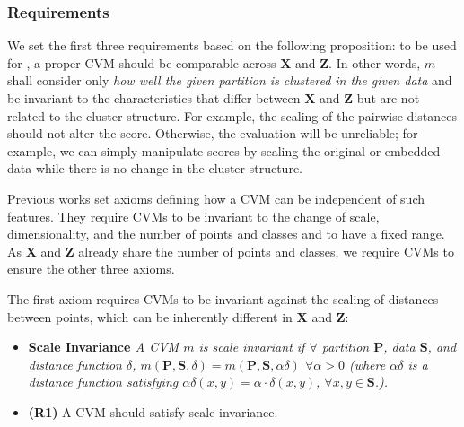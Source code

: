 \subsubsection{Requirements}

\label{sec:req}


We set the first three requirements based on the following proposition: to be used for \ltc, a proper CVM should be comparable across $\mathbf{X}$ and $\mathbf{Z}$.
In other words, $m$ shall consider only \textit{how well the given partition is clustered in the given data} and be invariant to the characteristics that differ between $\mathbf{X}$ and $\mathbf{Z}$ but are not related to the cluster structure. 
For example, the scaling of the pairwise distances should not alter the score. Otherwise, the evaluation will be unreliable; for example, we can simply manipulate \ltc scores by scaling the original or embedded data while there is no change in the cluster structure.

Previous works \cite{jeon22arxiv2, bendavid08neurips} set axioms defining how a CVM can be independent of such features.
They require CVMs to be invariant to the change of scale, dimensionality, and the number of points and classes and to have a fixed range. 
As $\mathbf{X}$ and $\mathbf{Z}$ already share the number of points and classes, we require CVMs to ensure the other three axioms. %


The first axiom requires CVMs to be invariant against the scaling of distances between points, which can be inherently different in $\mathbf{X}$ and $\mathbf{Z}$:
\begin{itemize}[leftmargin=0pt]
    \item [] \textbf{Scale Invariance \cite{bendavid08neurips}} \textit{A CVM $m$ is scale invariant if $\forall$ partition $\mathbf{P}$, data $\mathbf{S}$, and distance function $\delta$, $m(\mathbf{P}, \mathbf{S}, \delta) = m(\mathbf{P}, \mathbf{S}, \alpha \delta)$ $\forall \alpha > 0$ (where $\alpha \delta$ is a distance function satisfying $\alpha \delta(x,y) = \alpha \cdot \delta(x,y)$, $\forall x, y \in \mathbf{S}$.). }
    \item [] \textbf{(R1)} A CVM should satisfy scale invariance.
\end{itemize}

